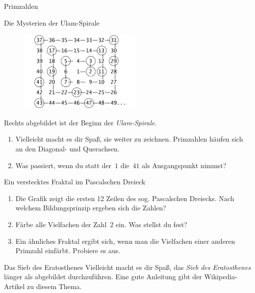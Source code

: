 \documentclass{uebblatt}
\begin{document}
\begin{blatt}{Primzahlen}

\begin{aufgabe}{Die Mysterien der Ulam-Spirale}
\begin{figure}
\vspace*{-1.5cm}
\includegraphics[width=6cm]{ulam}
\end{figure}
Rechts abgebildet ist der Beginn der \emph{Ulam-Spirale}. 
\begin{enumerate}
\item Vielleicht macht es dir Spaß, sie weiter zu zeichnen. Primzahlen häufen
sich an den Diagonal- und Querachsen.
\item Was passiert, wenn du statt der~$1$ die~$41$ als Ausgangspunkt nimmst?
\end{enumerate}
\end{aufgabe}

\begin{aufgabe}{Ein verstecktes Fraktal im Pascalschen Dreieck}
\begin{enumerate}
\item Die Grafik zeigt die ersten 12 Zeilen des sog. Pascalschen Dreiecks. Nach
welchem Bildungsprinzip ergeben sich die Zahlen?
\item Färbe alle Vielfachen der Zahl~2 ein. Was stellst du fest?
\item Ein ähnliches Fraktal ergibt sich, wenn man die Vielfachen einer anderen
Primzahl einfärbt. Probiere es aus.
\end{enumerate}
\centering\pascaltriangle
\end{aufgabe}

\enlargethispage{2em}
\begin{aufgabe}{Das Sieb des Eratosthenes}
Vielleicht macht es dir Spaß, das \emph{Sieb des Eratosthenes} länger als
abgebildet durchzuführen. Eine gute Anleitung gibt der Wikipedia-Artikel zu
diesem Thema.
\smallskip

\centering
{}
\end{aufgabe}


\end{blatt}
\end{document}
